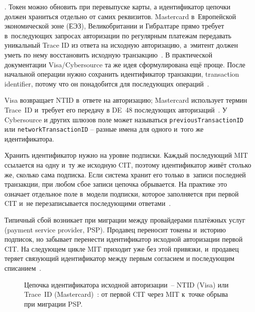 . Токен можно обновить при перевыпуске
карты, а идентификатор цепочки должен храниться отдельно от самих
реквизитов. Mastercard в~Европейской экономической зоне (ЕЭЗ), Великобритании и Гибралтаре прямо требует
в~последующих запросах авторизации по регулярным платежам передавать
уникальный Trace ID из ответа на исходную авторизацию, а~эмитент должен
уметь по нему восстановить исходную транзакцию~\cite{mc-tpr}. В
практической документации Visa/Cybersource та же идея сформулирована
ещё проще. После начальной операции нужно сохранить идентификатор
транзакции, transaction identifier, потому что он понадобится для
последующих операций~\cite{cybs-initial-transactions}.

Visa возвращает NTID в~ответе на авторизацию; Mastercard использует
термин Trace~ID и~требует его передачу в DE~48 последующих
авторизаций~\cite{mc-tpr,cybs-initial-transactions}. У
Cybersource и других шлюзов поле может называться
\texttt{previousTransactionID} или
\texttt{networkTransactionID} -- разные имена для одного
и~того же идентификатора.

Хранить идентификатор нужно на уровне подписки. Каждый последующий
MIT ссылается на одну и~ту же исходную CIT, поэтому идентификатор
живёт столько же, сколько сама подписка. Если система хранит его
только в~записи последней транзакции, при любом сбое записи цепочка
обрывается.
На практике это означает отдельное поле в~модели подписки,
которое заполняется при первой CIT и~не перезаписывается
последующими ответами~\cite{cybs-mc-subscription-mit}.

Типичный сбой возникает при миграции между провайдерами платёжных услуг (payment service provider, PSP). Продавец переносит
токены и~историю подписок, но забывает перенести идентификатор
исходной авторизации первой CIT. На следующем цикле MIT приходит уже
без этой привязки, и~продавец теряет связующий идентификатор
между первым согласием и последующим списанием~\cite{mc-tpr,cybs-mc-subscription-mit}.

\begin{figure}[tbp]
  \centering
  \caption{Цепочка идентификатора исходной авторизации~--
  NTID (Visa) или Trace~ID (Mastercard)~\cite{mrc-nti-trace-id}:
  от первой CIT через MIT к~точке обрыва при миграции PSP.}\label{fig:ntid-chain}
\end{figure}

